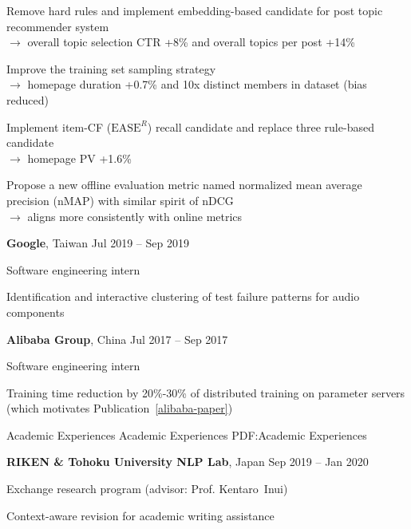 \documentclass[letterpaper,MMMyyyy,nonstopmode]{simpleresumecv}
\begin{document}
\begin{Body}
\SubBulletItem
Remove hard rules and implement embedding-based candidate for post topic recommender system \\
$\rightarrow$ overall topic selection CTR +8\% and overall topics per post +14\%

\SubBulletItem
Improve the training set sampling strategy \\
$\rightarrow$ homepage duration +0.7\% and 10x distinct members in dataset (bias reduced)

\SubBulletItem
Implement item-CF ($\text{EASE}^{R}$) recall candidate and replace three rule-based candidate \\
$\rightarrow$ homepage PV +1.6\%

\SubBulletItem
Propose a new offline evaluation metric named normalized mean average precision (nMAP) with similar spirit of nDCG \\
$\rightarrow$ aligns more consistently with online metrics

\BigGap

\Entry
\textbf{Google}, Taiwan
\hfill
Jul 2019 -- Sep 2019

\Gap
\BulletItem
Software engineering intern

\SubBulletItem
Identification and interactive clustering of test failure patterns for audio components

\BigGap

\Entry
\textbf{Alibaba Group}, China
\hfill
Jul 2017 -- Sep 2017

\Gap
\BulletItem
Software engineering intern

\SubBulletItem
Training time reduction by 20\%-30\% of distributed training on parameter servers (which motivates Publication~\ref{alibaba-paper})



\BigGap

\Section
{Academic Experiences}
{Academic Experiences}
{PDF:Academic Experiences}


\Entry
\textbf{RIKEN \& Tohoku University NLP Lab}, Japan
\hfill
Sep 2019 -- Jan 2020

\Gap
\BulletItem
Exchange research program (advisor: Prof. Kentaro~Inui)

\SubBulletItem
Context-aware revision for academic writing assistance

\BigGap


\end{Body}
\end{document}
